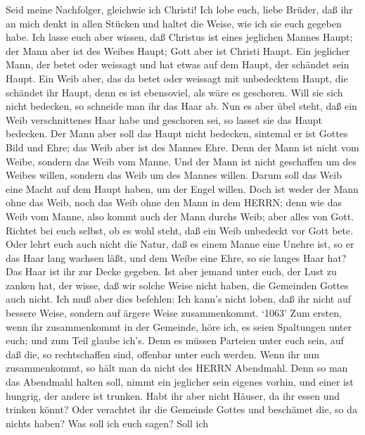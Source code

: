  Seid meine Nachfolger, gleichwie ich Christi! 
Ich lobe euch, liebe Brüder, daß ihr an mich denkt in allen Stücken und
haltet die Weise, wie ich sie euch gegeben habe.  Ich lasse
euch aber wissen, daß Christus ist eines jeglichen Mannes Haupt; der
Mann aber ist des Weibes Haupt; Gott aber ist Christi Haupt.
 Ein jeglicher Mann, der betet oder weissagt und hat etwas
auf dem Haupt, der schändet sein Haupt.  Ein Weib aber, das
da betet oder weissagt mit unbedecktem Haupt, die schändet ihr Haupt,
denn es ist ebensoviel, als wäre es geschoren.  Will sie
sich nicht bedecken, so schneide man ihr das Haar ab. Nun es aber übel
steht, daß ein Weib verschnittenes Haar habe und geschoren sei, so
lasset sie das Haupt bedecken.  Der Mann aber soll das Haupt
nicht bedecken, sintemal er ist Gottes Bild und Ehre; das Weib aber ist
des Mannes Ehre.  Denn der Mann ist nicht vom Weibe, sondern
das Weib vom Manne.  Und der Mann ist nicht geschaffen um
des Weibes willen, sondern das Weib um des Mannes willen. 
Darum soll das Weib eine Macht auf dem Haupt haben, um der Engel willen.
 Doch ist weder der Mann ohne das Weib, noch das Weib ohne
den Mann in dem HERRN;  denn wie das Weib vom Manne, also
kommt auch der Mann durchs Weib; aber alles von Gott. 
Richtet bei euch selbst, ob es wohl steht, daß ein Weib unbedeckt vor
Gott bete.  Oder lehrt euch auch nicht die Natur, daß es
einem Manne eine Unehre ist, so er das Haar lang wachsen läßt,
 und dem Weibe eine Ehre, so sie langes Haar hat? Das Haar
ist ihr zur Decke gegeben.  Ist aber jemand unter euch, der
Lust zu zanken hat, der wisse, daß wir solche Weise nicht haben, die
Gemeinden Gottes auch nicht.  Ich muß aber dies befehlen:
Ich kann's nicht loben, daß ihr nicht auf bessere Weise, sondern auf
ärgere Weise zusammenkommt.  `1063' Zum ersten, wenn ihr
zusammenkommt in der Gemeinde, höre ich, es seien Spaltungen unter euch;
und zum Teil glaube ich's.  Denn es müssen Parteien unter
euch sein, auf daß die, so rechtschaffen sind, offenbar unter euch
werden.  Wenn ihr nun zusammenkommt, so hält man da nicht
des HERRN Abendmahl.  Denn so man das Abendmahl halten
soll, nimmt ein jeglicher sein eigenes vorhin, und einer ist hungrig,
der andere ist trunken.  Habt ihr aber nicht Häuser, da ihr
essen und trinken könnt? Oder verachtet ihr die Gemeinde Gottes und
beschämet die, so da nichts haben? Was soll ich euch sagen? Soll ich
